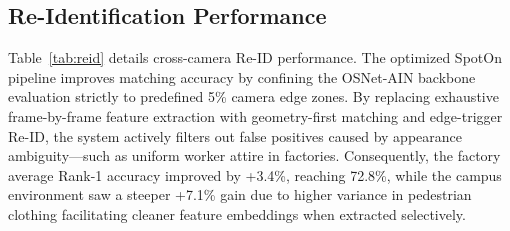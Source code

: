 \subsection{Re-Identification Performance}
\label{subsec:reid-results}

Table~\ref{tab:reid} details cross-camera Re-ID performance. The optimized SpotOn pipeline improves matching accuracy by confining the OSNet-AIN backbone evaluation strictly to predefined 5\% camera edge zones. By replacing exhaustive frame-by-frame feature extraction with geometry-first matching and edge-trigger Re-ID, the system actively filters out false positives caused by appearance ambiguity---such as uniform worker attire in factories. Consequently, the factory average Rank-1 accuracy improved by +3.4\%, reaching 72.8\%, while the campus environment saw a steeper +7.1\% gain due to higher variance in pedestrian clothing facilitating cleaner feature embeddings when extracted selectively.

\begin{table}[H]
\caption{Re-ID Performance: Baseline vs.\ Optimized}
\label{tab:reid}
\centering
\renewcommand{\arraystretch}{1.15}
\end{table}

